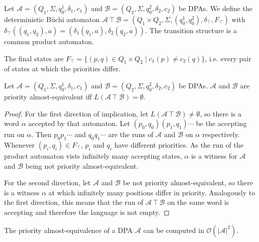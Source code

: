 \begin{defn}
	Let $\mathcal{A} = (Q_1, \Sigma, q^1_0, \delta_1, c_1)$ and $\mathcal{B} = (Q_2, \Sigma, q^2_0, \delta_2, c_2)$ be DPAs. We define the deterministic Büchi automaton $\mathcal{A} \intercal \mathcal{B} = (Q_1 \times Q_2, \Sigma, (q^1_0, q^2_0), \delta_\intercal, F_\intercal)$ with $\delta_\intercal((q_1, q_2), a) = (\delta_1(q_1, a), \delta_2(q_2, a))$. The transition structure is a common product automaton.
	
	The final states are $F_\intercal = \{ (p, q) \in Q_1 \times Q_2 \mid c_1(p) \neq c_2(q) \}$, i.e. every pair of states at which the priorities differ. 
\end{defn}

\begin{lem}
\label{lem:schewe:equiv_intercal}
	Let $\mathcal{A} = (Q_1, \Sigma, q^1_0, \delta_1, c_1)$ and $\mathcal{B} = (Q_2, \Sigma, q^2_0, \delta_2, c_2)$ be DPAs. $\mathcal{A}$ and $\mathcal{B}$ are priority almost-equivalent iff $L(\mathcal{A} \intercal \mathcal{B}) = \emptyset$. 
\end{lem}

\begin{proof}
	For the first direction of implication, let $L(\mathcal{A} \intercal \mathcal{B}) \neq \emptyset$, so there is a word $\alpha$ accepted by that automaton. Let $(p_0, q_0) (p_1, q_1) \cdots$ be the accepting run on $\alpha$. Then $p_0 p_1 \cdots$ and $q_0 q_1 \cdots$ are the runs of $\mathcal{A}$ and $\mathcal{B}$ on $\alpha$ respectively. Whenever $(p_i, q_i) \in F_\intercal$, $p_i$ and $q_i$ have different priorities. As the run of the product automaton vists infinitely many accepting states, $\alpha$ is a witness for $\mathcal{A}$ and $\mathcal{B}$ being not priority almost-equivalent.
	
	For the second direction, let $\mathcal{A}$ and $\mathcal{B}$ be not priority almost-equivalent, so there is a witness $\alpha$ at which infinitely many positions differ in priority. Analogously to the first direction, this means that the run of $\mathcal{A} \intercal \mathcal{B}$ on the same word is accepting and therefore the language is not empty.
\end{proof}

\begin{lem}
	The priority almost-equivalence of a DPA $\mathcal{A}$ can be computed in $\mathcal{O}(|\mathcal{A}|^2)$.
\end{lem}


